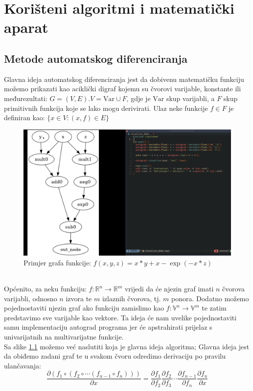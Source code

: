 \documentclass[zavrsnirad]{fer}
\begin{document}
\chapter{Korišteni algoritmi i matematički aparat}
\label{pog:teorijski_dio}

\section{Metode automatskog diferenciranja}
Glavna ideja automatskog diferenciranja jest da dobivenu matematičku funkciju možemo prikazati kao aciklički digraf kojemu su čvorovi varijable, konstante ili međurezultati: $G = (V, E). V = \mathrm{Var} \cup F$, gdje je $\mathrm{Var}$ skup varijabli, a $F$ skup primitivnih funkcija koje se lako mogu derivirati. Ulaz neke funkcije $f \in F$ je definiran kao: $\{x \in V \colon (x, f) \in E\}$
\begin{figure}[h]
  \centering
  \includegraphics[width=0.7\linewidth]{../../pics/demo1.png}
  \caption{Primjer grafa funkcije: $f(x, y, z) = x * y + x - \exp(-x*z)$}
  \label{slk:graf_funkcije1}
\end{figure}
\\
Općenito, za neku funkciju: $f\colon \mathbb{R}^n \rightarrow \mathbb{R}^m$ vrijedi da će njezin graf imati $n$ čvorova varijabli, odnosno $n$ izvora te $m$ izlaznih čvorova, tj. $m$ ponora. Dodatno možemo pojednostaviti njezin graf ako funkciju zamislimo kao $f\colon \mathbb{V}^n \rightarrow \mathbb{V}^m$ te zatim predstavimo sve varijable kao vektore. Ta ideja će nam uvelike pojednostaviti samu implementaciju autograd programa jer će apstrahirati prijelaz s univarijatnih na multivarijatne funkcije.
\\
Sa slike \ref{slk:graf_funkcije1} možemo već naslutiti koja je glavna ideja algoritma; Glavna ideja jest da obiđemo zadani graf te u svakom čvoru odredimo derivaciju po pravilu ulančavanja:
\begin{equation}
  \frac{\partial (f_1 \circ (f_2 \circ \dotsb (f_{n-1} \circ f_n)))}{\partial x}
    = \frac{\partial f_1}{\partial f_2} \frac{\partial f_2}{\partial f_3}
      \dotsb
      \frac{\partial f_{n-1}}{\partial f_n} \frac{\partial f_n}{\partial x}
\end{equation}
\end{document}
